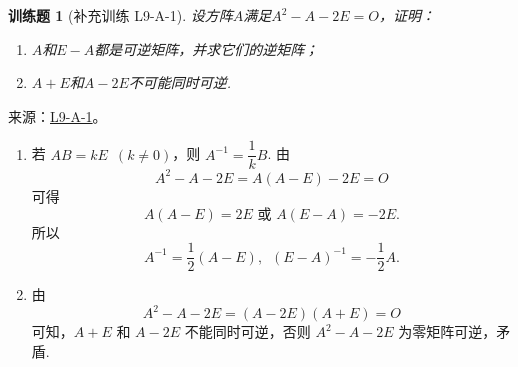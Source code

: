 \documentclass[UTF8,12pt,a4paper,fontset=fandol]{ctexart}
\newtheorem{exercise}{训练题}[section]
\begin{document}
\begin{exercise}[补充训练 L9-A-1]\label{prob:L9-A-1}
设方阵$A$满足$A^2-A-2E=O$，证明：
        \begin{enumerate}
            \item $A$和$E-A$都是可逆矩阵，并求它们的逆矩阵；

            \item $A+E$和$A-2E$不可能同时可逆.
        \end{enumerate}
\end{exercise}
\noindent 来源：\href{https://github.com/yhwu-is/Linear-Algebra-Left-Undone/blob/new/%E8%AE%B2%E4%B9%89/%E4%B8%93%E9%A2%98/9%20%E7%9F%A9%E9%98%B5%E8%BF%90%E7%AE%97%E8%BF%9B%E9%98%B6.tex}{L9-A-1}。
\begin{solve}
\begin{enumerate}
                \item 若 $ AB = kE \enspace(k \neq 0) $，则 $ A^{-1} = \dfrac{1}{k} B $. 由
                      \[ A^2 - A - 2E = A(A - E) - 2E = O \]
                      可得
                      \[ A(A - E) = 2E \text{~或~} A(E - A) = -2E. \]
                      所以
                      \[ A^{-1} = \frac{1}{2}(A-E),\enspace (E - A)^{-1} = -\frac{1}{2}A. \]

                \item 由
                      \[  A^2 - A - 2E = (A - 2E)(A + E) = O \]
                      可知，$ A + E $ 和 $ A - 2E $ 不能同时可逆，否则 $ A^2 - A - 2E $ 为零矩阵可逆，矛盾.
            \end{enumerate}
\end{solve}
\end{document}
